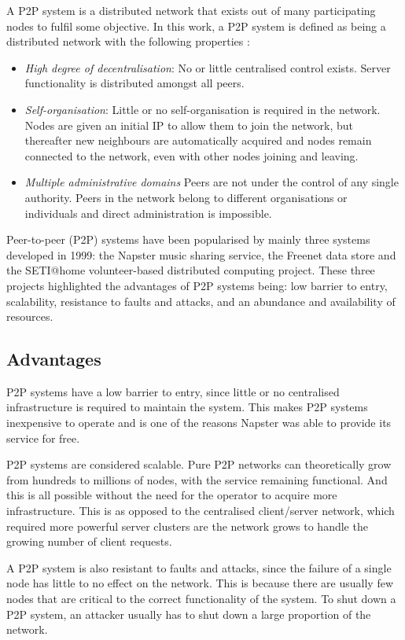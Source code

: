 A P2P system is a distributed network that exists out of many participating nodes to fulfil some objective. In this work, a P2P system is defined as being a distributed network with the following properties
\cite{Rodrigues_acm_comms_p2p}:
%
\begin{itemize}
\item \emph{High degree of decentralisation}:  No or little centralised control exists. Server functionality is distributed amongst all peers.
\item \emph{Self-organisation}: Little or no self-organisation is required in the network. Nodes are given an initial IP to allow them to join the network, but thereafter new neighbours are automatically acquired and nodes remain connected to the network, even with other nodes joining and leaving.
\item \emph{Multiple administrative domains} Peers are not under the control of any single authority. Peers in the network belong to different organisations or individuals and direct administration is impossible.
\end{itemize}

Peer-to-peer (P2P) systems have been popularised by mainly three systems developed in 1999: the Napster music sharing service, the Freenet data store and the SETI@home volunteer-based distributed computing project. These three projects highlighted the advantages of P2P systems being: low barrier to entry, scalability, resistance to faults and attacks, and an abundance and availability of resources.

\subsection{Advantages}

P2P systems have a low barrier to entry, since little or no centralised infrastructure is required to maintain the system. This makes P2P systems inexpensive to operate and is one of the reasons Napster was able to provide its service for free.

P2P systems are considered scalable. Pure P2P networks can theoretically grow from hundreds to millions of nodes, with the service remaining functional. And this is all possible without the need for the operator to acquire more infrastructure. This is as opposed to the centralised client/server network, which required more powerful server clusters are the network grows to handle the growing number of client requests.

A P2P system is also resistant to faults and attacks, since the failure of a single node has little to no effect on the network. This is because there are usually few nodes that are critical to the correct functionality of the system. To shut down a P2P system, an attacker usually has to shut down a large proportion of the network.

